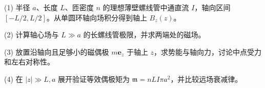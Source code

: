 (1) 半径 \(a\)、长度 \(L\)、匝密度 \(n\) 的理想薄壁螺线管中通直流 \(I\)，轴向区间 \([-L/2,L/2]\)。从单圆环轴向场积分得到轴上 \(B_z(z)\)。

(2) 计算轴心场与 \(L\gg a\) 的长螺线管极限，并求两端处的磁场。

(3) 放置沿轴向且足够小的磁偶极 \(m\mathbf e_z\) 于轴上 \(z\)，求势能与轴向力，讨论中点受力和左右对称性。

(4) 在 \(|z|\gg L,a\) 展开验证等效偶极矩为 \(\mathfrak m=nLI\pi a^2\)，并比较远场衰减律。
